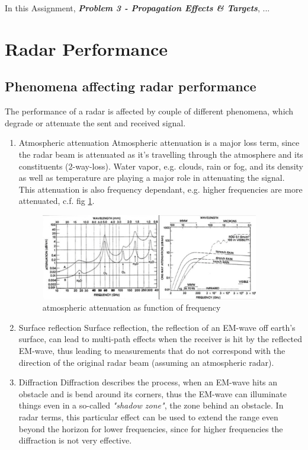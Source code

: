 

In this Assignment, \textit{\textbf{Problem 3 - Propagation Effects \& Targets}}, ...


\section{Radar Performance}

\subsection{Phenomena affecting radar performance}
The performance of a radar is affected by couple of different phenomena, which degrade or attenuate the sent and received signal.
\begin{enumerate}
	\item Atmospheric attenuation
			Atmospheric attenuation is a major loss term, since the radar beam is attenuated as it's travelling through the atmosphere and its constituents (2-way-loss).
			Water vapor, e.g. clouds, rain or fog, and its density as well as temperature are playing a major role in attenuating the signal. This attenuation is also frequency dependant, e.g. higher frequencies are more attenuated, c.f. fig \ref{fig:attenuation}.
			\begin{figure}[!htbp]
			\centering
			\includegraphics[width=0.9\textwidth]{images/attenuation}
			\caption{atmospheric attenuation as function of frequency \citep{erickson:lecture}}
			\label{fig:attenuation}
			\end{figure}
	\item Surface reflection
			Surface reflection, the reflection of an EM-wave off earth's surface, can lead to multi-path effects when the receiver is hit by the reflected EM-wave, thus leading to measurements that do not correspond with the direction of the original radar beam (assuming an atmospheric radar).
	\item Diffraction
			Diffraction describes the process, when an EM-wave hits an obstacle and is bend around its corners, thus the EM-wave can illuminate things even in a so-called \textit{"shadow zone"}, the zone behind an obstacle. In radar terms, this particular effect can be used to extend the range even beyond the horizon for lower frequencies, since for higher frequencies the diffraction is not very effective.

\end{enumerate}
